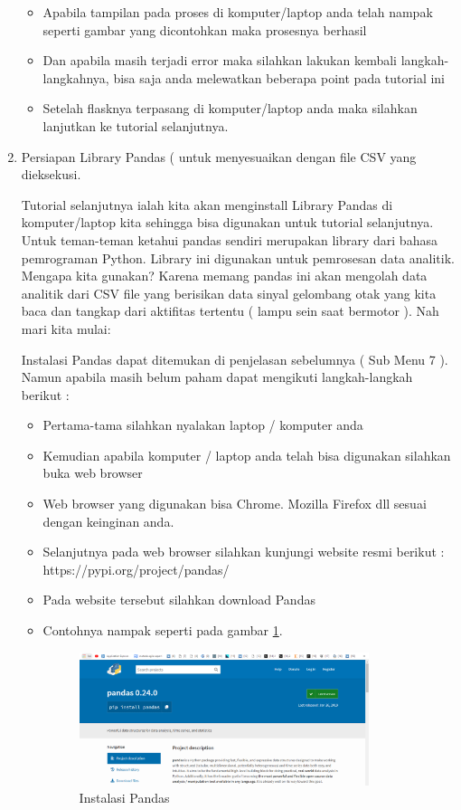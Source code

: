 \begin{enumerate}
\begin{itemize}
\item Apabila tampilan pada proses di komputer/laptop anda telah nampak seperti gambar yang dicontohkan maka prosesnya berhasil
\item Dan apabila masih terjadi error maka silahkan lakukan kembali langkah-langkahnya, bisa saja anda melewatkan beberapa point pada tutorial ini
\item Setelah flasknya terpasang di komputer/laptop anda maka silahkan lanjutkan ke tutorial selanjutnya.
\end{itemize}

\item Persiapan Library Pandas ( untuk menyesuaikan dengan file CSV yang dieksekusi.

Tutorial selanjutnya ialah kita akan menginstall Library Pandas di komputer/laptop kita sehingga bisa digunakan untuk tutorial selanjutnya. Untuk teman-teman ketahui pandas sendiri merupakan library dari bahasa pemrograman Python. Library ini digunakan untuk pemrosesan data analitik. Mengapa kita gunakan? Karena memang pandas ini akan mengolah data analitik dari CSV file yang berisikan data sinyal gelombang otak yang kita baca dan tangkap dari aktifitas tertentu ( lampu sein saat bermotor ). Nah mari kita mulai:

Instalasi Pandas dapat ditemukan di penjelasan sebelumnya ( Sub Menu 7 ). Namun apabila masih belum paham dapat mengikuti langkah-langkah berikut :
\begin{itemize}
\item Pertama-tama silahkan nyalakan laptop / komputer anda
\item Kemudian apabila komputer / laptop anda telah bisa digunakan silahkan buka web browser 
\item Web browser yang digunakan bisa Chrome. Mozilla Firefox dll sesuai dengan keinginan anda.
\item Selanjutnya pada web browser silahkan kunjungi website resmi berikut : https://pypi.org/project/pandas/
\item Pada website tersebut silahkan download Pandas
\item Contohnya nampak seperti pada gambar \ref{fig:inspa}.
\begin{figure}[!htbp]
	\centerline{\includegraphics[width=0.85\textwidth]{figures/10/inspa.PNG}}
	\caption{Instalasi Pandas}
	\label{fig:inspa}
\end{figure}


\end{itemize}
\end{enumerate}
